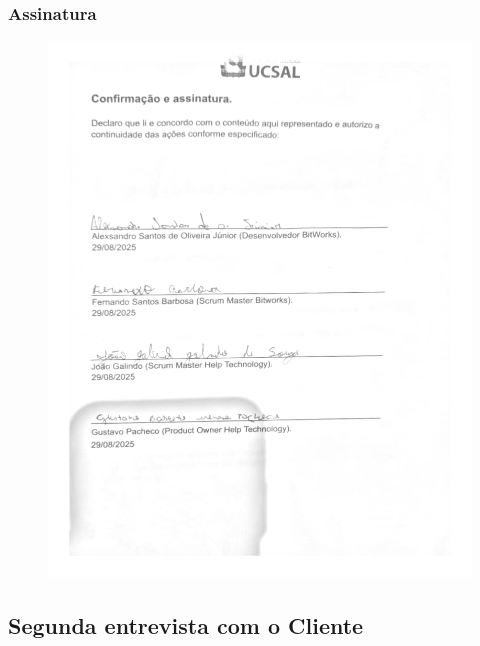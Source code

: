 \documentclass[12pt,oneside,a4paper,article]{abntex2}
\begin{document}
    \subsubsection{Assinatura}
    \begin{figure}[H]
        \centering
        \includegraphics[width=0.75\linewidth]{imagens-template/Entrevista1/assinatura.png}
        \label{fig:placeholder}
    \end{figure}

    \subsection{Segunda entrevista com o Cliente}
\end{document}
